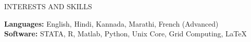 \documentclass{resume} %
\begin{document}
\newpage
\begin{rSection}{INTERESTS AND SKILLS}

{\bf Languages:} English, Hindi, Kannada, Marathi, French (Advanced) \\
{\bf Software:} STATA, R, Matlab, Python, Unix Core, Grid Computing, \LaTeX

\end{rSection}

\end{document}
